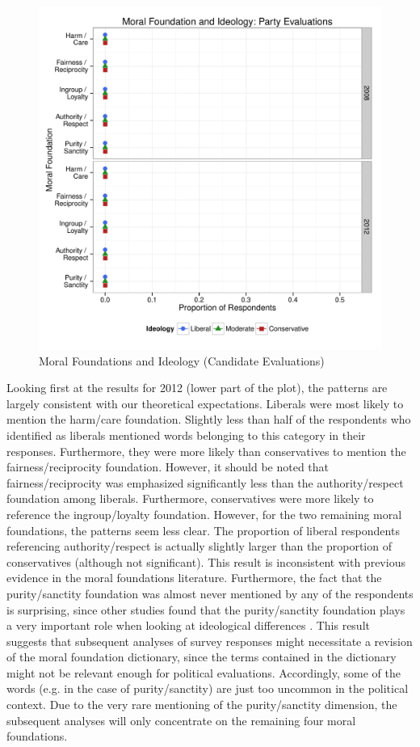 \documentclass[12pt]{article}
\begin{document}
\begin{figure}\centering
\includegraphics[scale=.6]{../calc/fig/p3_mft_ideol_pa.pdf}
\caption{Moral Foundations and Ideology (Candidate Evaluations)}\label{fig:mft_ideol_ca}
\end{figure}

Looking first at the results for 2012 (lower part of the plot), the patterns are largely consistent with our theoretical expectations. Liberals were most likely to mention the harm/care foundation. Slightly less than half of the respondents who identified as liberals mentioned words belonging to this category in their responses. Furthermore, they were more likely than conservatives to mention the fairness/reciprocity foundation. However, it should be noted that fairness/reciprocity was emphasized significantly less than the authority/respect foundation among liberals. Furthermore, conservatives were more likely to reference the ingroup/loyalty foundation. However, for the two remaining moral foundations, the patterns seem less clear. The proportion of liberal respondents referencing authority/respect is actually slightly larger than the proportion of conservatives (although not significant). This result is inconsistent with previous evidence in the moral foundations literature. Furthermore, the fact that the purity/sanctity foundation was almost never mentioned by any of the respondents is surprising, since other studies found that the purity/sanctity foundation plays a very important role when looking at ideological differences \citep{koleva2012tracing}. This result suggests that subsequent analyses of survey responses might necessitate a revision of the moral foundation dictionary, since the terms contained in the dictionary might not be relevant enough for political evaluations. Accordingly, some of the words (e.g. in the case of purity/sanctity) are just too uncommon in the political context. Due to the very rare mentioning of the purity/sanctity dimension, the subsequent analyses will only concentrate on the remaining four moral foundations.
\end{document}
